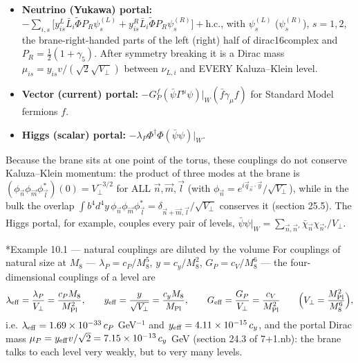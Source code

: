 \documentclass[10pt,a4paper]{article}
\makeatletter
\renewcommand\subsubsection{\@startsection{subsubsection}{3}{\z@}{-3.25ex\@plus -1ex \@minus -.2ex}{1.5ex \@plus .2ex}{\normalfont\normalsize\bfseries\raggedright}}
\makeatother
\begin{document}
\begin{itemize}
\item \textbf{Neutrino (Yukawa) portal:} $-\sum_{i,s}\big[y^L_{is}\bar L_i\tilde\Phi P_R\psi^{(L)}_s+y^R_{is}\bar L_i\tilde\Phi P_R\psi^{(R)}_s\big]+\text{h.c.}$, with $\psi^{(L)}_s$ ($\psi^{(R)}_s$), $s=1,2$, the brane-right-handed parts of the left (right) half of dirac16complex and $P_R=\frac12(1+\gamma_5)$. After symmetry breaking it is a Dirac mass $\mu_{is}=y_{is}v/(\sqrt2\sqrt{V_\perp})$ between $\nu_{L,i}$ and EVERY Kaluza–Klein level.
\item \textbf{Vector (current) portal:} $-G^f_P(\bar\psi\Gamma^\mu\psi)|_W(\bar f\gamma_\mu f)$ for Standard Model fermions $f$.
\item \textbf{Higgs (scalar) portal:} $-\lambda_P\Phi^\dagger\Phi(\bar\psi\psi)|_W$.
\end{itemize}
Because the brane sits at one point of the torus, these couplings do not conserve Kaluza–Klein momentum: the product of three modes at the brane is $(\phi_{\vec n}\phi_{\vec m}\phi^*_{\vec l})(0)=V_\perp^{-3/2}$ for ALL $\vec n,\vec m,\vec l$ (with $\phi_{\vec n}=e^{i\vec q_{\vec n}\cdot\vec y}/\sqrt{V_\perp}$), while in the bulk the overlap $\int b^4d^4y\,\phi_{\vec n}\phi_{\vec m}\phi^*_{\vec l}=\delta_{\vec n+\vec m,\vec l}/\sqrt{V_\perp}$ conserves it (section 25.5). The Higgs portal, for example, couples every pair of levels, $\bar\psi\psi|_W=\sum_{\vec n,\vec n'}\bar\chi_{\vec n}\chi_{\vec n'}/V_\perp$.

\subsubsection*{Example 10.1 — natural couplings are diluted by the volume}
For couplings of natural size at $M_8$ — $\lambda_P=c_P/M_8^5$, $y=c_y/M_8^2$, $G_P=c_V/M_8^6$ — the four-dimensional couplings of a level are
\begin{equation*}
\lambda_{\rm eff}=\frac{\lambda_P}{V_\perp}=\frac{c_PM_8}{M_{\rm Pl}^2},\qquad y_{\rm eff}=\frac y{\sqrt{V_\perp}}=\frac{c_yM_8}{M_{\rm Pl}},\qquad G_{\rm eff}=\frac{G_P}{V_\perp}=\frac{c_V}{M_{\rm Pl}^2}\qquad\Big(V_\perp=\frac{M_{\rm Pl}^2}{M_8^6}\Big),
\end{equation*}
i.e. $\lambda_{\rm eff}=1.69\times10^{-33}\,c_P$ GeV$^{-1}$ and $y_{\rm eff}=4.11\times10^{-15}\,c_y$, and the portal Dirac mass $\mu_P=y_{\rm eff}v/\sqrt2=7.15\times10^{-13}\,c_y$ GeV (section 24.3 of 7+1.nb): the brane talks to each level very weakly, but to very many levels.
\end{document}
